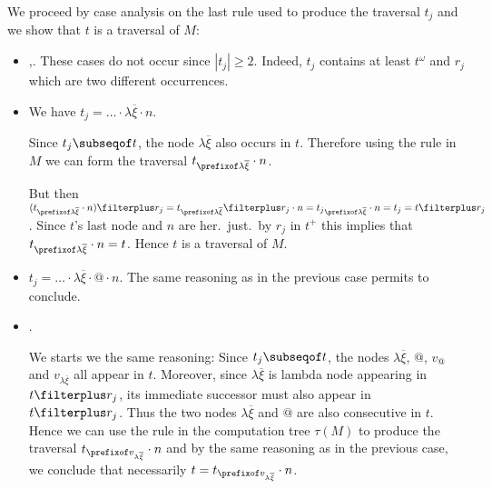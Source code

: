   We proceed by case analysis on the last rule used to produce the traversal $t_j$ and we show that $t$ is a traversal of $M$:
  \begin{itemize}
    \item {},. These cases do not occur since $|t_j| \geq 2$. Indeed, $t_j$ contains at least $t^\omega$ and $r_j$ which are two different occurrences.

    \item {}
        We have  $t_j = \ldots \cdot \lambda \overline{\xi} \cdot n$.

        Since $t_j \subseqof t$, the node $\lambda \overline{\xi}$ also occurs in $t$.
        Therefore using the rule  in $M$ we can form the traversal
        $t_{\prefixof \lambda \overline{\xi}} \cdot n$.

        But then $(t_{\prefixof \lambda \overline{\xi}} \cdot n) \filterplus r_j =
        t_{\prefixof \lambda \overline{\xi}} \filterplus r_j \cdot n
        = {t_j}_{\prefixof \lambda \overline{\xi}} \cdot n = t_j = t \filterplus r_j$.
        Since $t$'s last node and $n$ are her.\ just.\ by $r_j$ in $t^+$ this implies that
         $t_{\prefixof \lambda \overline{\xi}} \cdot n = t$.
        Hence $t$ is a traversal of $M$.

    \item {} $t_j = \ldots \cdot \lambda \overline{\xi} \cdot @ \cdot n$.
    The same reasoning as in the previous case permits to conclude.


    \item {} .

    We starts we the same reasoning: Since $t_j\subseqof t$, the nodes
    $\lambda \overline{\xi}$, $@$, $v_@$ and $v_{\lambda \overline{\xi}}$
    all appear in $t$. Moreover, since $\lambda \overline{\xi}$ is lambda node
    appearing in $t\filterplus r_j$, its immediate successor must also appear in
    $t\filterplus r_j$. Thus the two nodes $\lambda \overline{\xi}$ and $@$ are also consecutive in $t$. Hence
    we can use the rule  in the computation tree $\tau(M)$ to produce
    the traversal $t_{\prefixof v_{\lambda \overline{\xi}}} \cdot n$ and by the same reasoning as in the previous case, we
    conclude that necessarily $t = t_{\prefixof v_{\lambda \overline{\xi}}} \cdot n$.


\end{itemize}
